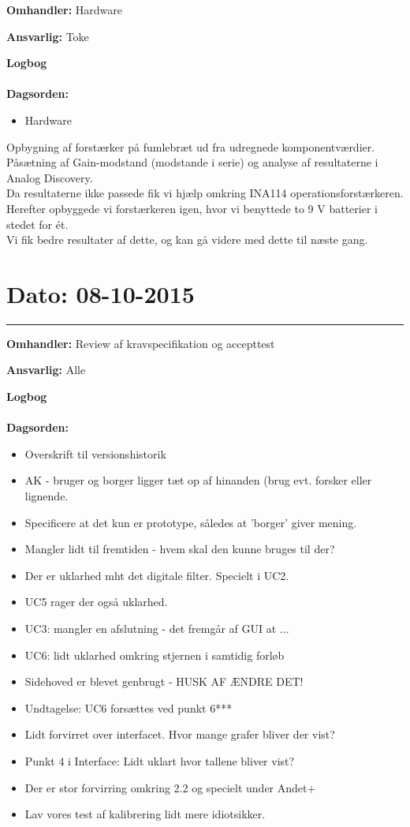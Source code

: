 \textbf{Omhandler:} Hardware

\textbf{Ansvarlig:} Toke

\textbf{Logbog}
\\
\\
\textbf{Dagsorden:}
\begin{itemize}
	\item Hardware
\end{itemize}
	
Opbygning af forstærker på fumlebræt ud fra udregnede komponentværdier. \\
Påsætning af Gain-modstand (modstande i serie) og analyse af resultaterne i Analog Discovery. \\
Da resultaterne ikke passede fik vi hjælp omkring INA114 operationsforstærkeren. Herefter opbyggede vi forstærkeren igen, hvor vi benyttede to 9 V batterier i stedet for ét. \\
Vi fik bedre resultater af dette, og kan gå videre med dette til næste gang.
	
	
	

\section{Dato: 08-10-2015 }
\hrule

\textbf{Omhandler:} Review af kravspecifikation og accepttest 

\textbf{Ansvarlig:} Alle

\textbf{Logbog}
\\
\\
\textbf{Dagsorden:}
\begin{itemize}
	\item Overskrift til versionshistorik
	\item AK - bruger og borger ligger tæt op af hinanden (brug evt. forsker eller lignende.
	\item Specificere at det kun er prototype, således at 'borger' giver mening.
	\item Mangler lidt til fremtiden - hvem skal den kunne bruges til der?
	\item Der er uklarhed mht det digitale filter. Specielt i UC2.
	\item UC5 rager der også uklarhed.
	\item UC3: mangler en afslutning - det fremgår af GUI at ...
	\item UC6: lidt uklarhed omkring stjernen i samtidig forløb
	\item Sidehoved er blevet genbrugt - HUSK AF ÆNDRE DET!
	\item Undtagelse: UC6 forsættes ved punkt 6***
	\item Lidt forvirret over interfacet. Hvor mange grafer bliver der vist? 
	\item Punkt 4 i Interface: Lidt uklart hvor tallene bliver vist?
	\item Der er stor forvirring omkring 2.2 og specielt under Andet+
	\item Lav vores test af kalibrering lidt mere idiotsikker. 
\end{itemize}

